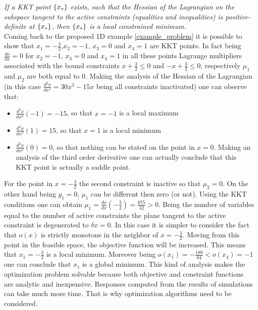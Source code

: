 \textit{ If a KKT point $\left\lbrace{x_*}\right \rbrace$ exists, such that the Hessian of the Lagrangian on the subspace tangent to the active constraints (equalities and inequalities) is positive-definite at $\left\lbrace{x_*}\right \rbrace$, then $\left\lbrace{x_*}\right \rbrace$ is a local constrained minimum.}\\
Coming back to the proposed 1D example \eqref{example_problem} it is possible to show that $x_1=-\frac{3}{2}$,$x_2=-1$, $x_3=0$ and $x_4=1$ are KKT points. In fact being $\frac{do}{dx}=0$ for $x_2=-1$, $x_3=0$ and $x_4=1$ in all these points Lagrange multipliers associated with the bound constraints $x+\frac{3}{2}\leq 0$ and $-x+\frac{3}{2}\leq 0$, respectively $\mu_1$ and $\mu_2$ are both equal to 0.
Making the analysis of the Hessian of the Lagrangian (in this case $\frac{d^2 o}{dx^2}=30x^3-15x$ being all constraints inactivated) one can observe that: 
\begin{itemize}
\item $\frac{d^2 o}{dx^2}(-1)=-15$, so that $x=-1$ is a local maximum
\item $\frac{d^2 o}{dx^2}(1)=15$, so that $x=1$ is a local minimum
\item $\frac{d^2 o}{dx^2}(0)=0$, so that nothing can be stated on the point in $x=0$. Making an analysis of the third order derivative one can actually conclude that this KKT point is actually a saddle point.
\end{itemize}
For the point in $x=-\frac{3}{2}$ the second constraint is inactive so that $\mu_2=0$. On the other hand being $g_1=0$, $\mu_1$ can be different then zero (or not). Using the KKT conditions one can obtain $\mu_1=\frac{do}{dx}(-\frac{3}{2})=\frac{675}{32}>0$. Being the number of variables equal to the number of active constraints the plane tangent to the active constraint is degenerated to $\delta x=0$. In this case it is simpler to consider the fact that $o(x)$ is strictly monotone in the neighbor of $x=-\frac{3}{2}$. Moving from this point in the feasible space, the objective function will be increased.  This means that $x_1= -\frac{3}{2}$ is a local minimum. Moreover being $o(x_1)=-\frac{189}{64}< o(x_4)=-1$ one can conclude that $x_1$ is a global minimum. This kind of analysis makes the optimization problem solvable because both objective and constraint functions are analytic and inexpensive. Responses computed from the results of simulations can take much more time. That is why optimization algorithms need to be considered.

